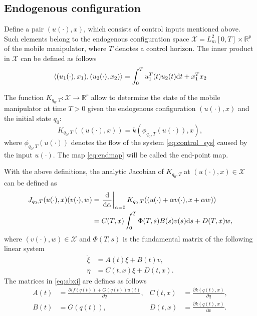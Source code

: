 \subsection{Endogenous configuration}
Define a pair $(u(\cdot), x)$, which consists of control inputs mentioned above.
Such elements belong to the endogenous configuration space
$\mathcal{X} = L_m^2[0, T] \times \mathbb{R}^p$ of the mobile manipulator, where $T$ denotes a control horizon.
The inner product in $\mathcal{X}$ can be defined as follows \cite{ecs_ijc}
\begin{equation}
\langle (u_1(\cdot), x_1), (u_2(\cdot), x_2) \rangle = \int_0^T u_1^T(t) u_2(t) \mathrm{d} t + x_1^T x_2
\end{equation}

The function
$K_{q_0, T}: \mathcal{X} \rightarrow \mathbb{R}^r$
allow to determine the state of the mobile manipulator at time $T>0$ given
the endogenous configuration $(u(\cdot), x)$ and the initial state $q_0$:
\begin{equation}
\label{eq:endmap}
K_{q_0, T}((u(\cdot), x)) = k(\phi_{q_0, T}(u(\cdot)), x),
\end{equation}
where $\phi_{q_0, T}(u(\cdot))$ denotes the flow of the system \eqref{eq:control_sys}
caused by the input $u(\cdot)$. The map \eqref{eq:endmap} will be called the end-point map.

With the above definitions, the analytic Jacobian of $K_{q_0, T}$ at $(u(\cdot), x) \in \mathcal{X}$ can be defined as \cite{ratajczak2013multiple}
\begin{align}
\label{eq:jacobian}
J_{q_0, T}(u(\cdot), x)(v(\cdot), w) &= \left.\frac{\mathrm{d}}{\mathrm{d} \alpha}\right|_{\alpha=0} K_{q_0, T}((u(\cdot)+\alpha v(\cdot), x+\alpha w))\\
 &= 
 C(T,x)\int_0^T \Phi(T,s)B(s)v(s)\mathrm{d} s + D(T,x)w,
\end{align}
where $(v(\cdot), w)\in \mathcal{X}$ and $\Phi(T,s)$ is the fundamental matrix of the following linear system \cite{tchon2004acceleration}
\begin{equation}
\begin{aligned}
\label{eq:abxi}
\dot \xi &= A(t)\xi + B(t) v, \\
\eta &= C(t, x)\xi + D(t, x).
\end{aligned}
\end{equation}
The matrices in \eqref{eq:abxi} are defines as follows
\begin{equation}
\begin{aligned}
A(t) &= \frac{\partial (f(q(t))+G(q(t))u(t)}{\partial q}, & C(t, x) &= \frac{\partial k(q(t), x)}{\partial q},\\
B(t) &= G(q(t)), & D(t, x) &= \frac{\partial k(q(t), x)}{\partial x}.
\end{aligned}
\end{equation}

